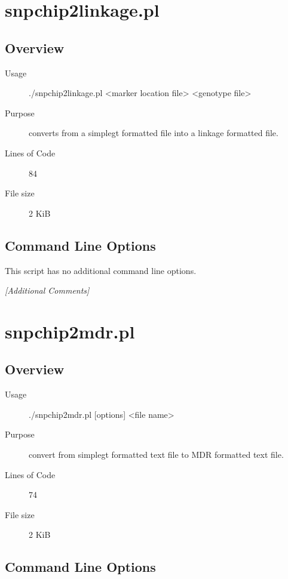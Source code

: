 \section{snpchip2linkage.pl}
\label{sec:snpchip2linkage.pl}

\subsection{Overview}
\label{sec:snpchip2linkage.pl-overview}

\begin{description}
\item[Usage] ./snpchip2linkage.pl <marker location file> <genotype file>
\item[Purpose] converts from a simplegt formatted file into a linkage formatted file.
\item[Lines of Code] 84
\item[File size] 2 KiB
\end{description}

\subsection{Command Line Options}
\label{sec:snpchip2linkage.pl-command-line}

This script has no additional command line options.

\emph{[Additional Comments]}

\section{snpchip2mdr.pl}
\label{sec:snpchip2mdr.pl}

\subsection{Overview}
\label{sec:snpchip2mdr.pl-overview}

\begin{description}
\item[Usage] ./snpchip2mdr.pl [options] <file name>
\item[Purpose] convert from simplegt formatted text file to MDR formatted text file.
\item[Lines of Code] 74
\item[File size] 2 KiB
\end{description}

\subsection{Command Line Options}
\label{sec:snpchip2mdr.pl-command-line}

